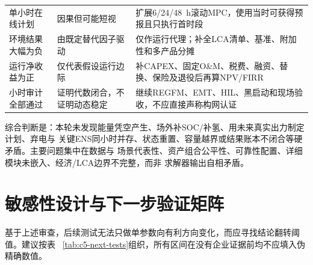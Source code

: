 \begin{longtable}{p{2.8cm}p{4.4cm}p{6.1cm}}
单小时在线计划 & 因果但可能短视 & 扩展6/24/48~h滚动MPC，使用当时可获得预报且只执行首时段\\
环境结果大幅为负 & 由既定替代因子驱动 & 仅作运行代理；补全LCA清单、基准、附加性和多产品分摊\\
运行净收益为正 & 仅代表假设运行边际 & 补CAPEX、固定O\&M、税费、融资、替换、保险及退役后再算NPV/FIRR\\
小时审计全部通过 & 证明代数闭合，不证明动态稳定 & 继续REGFM、EMT、HIL、黑启动和现场验收，不应直接声称构网认证\\
\bottomrule
\end{longtable}

综合判断是：本轮未发现能量凭空产生、场外补SOC/补氢、用未来真实出力制定计划、弃电与
关键ENS同小时并存、状态重置、容量越界或结果账本不闭合等硬矛盾。主要问题集中在数据与
场景代表性、资产组合公平性、可靠性配置、详细模块未嵌入、经济/LCA边界不完整，而非
求解器输出自相矛盾。

\section{敏感性设计与下一步验证矩阵}

基于上述审查，后续测试无法只做单参数向有利方向变化，而应寻找结论翻转阈值。建议按表
~\ref{tab:c5-next-tests}组织，所有区间在没有企业证据前均不应填入伪精确数值。

